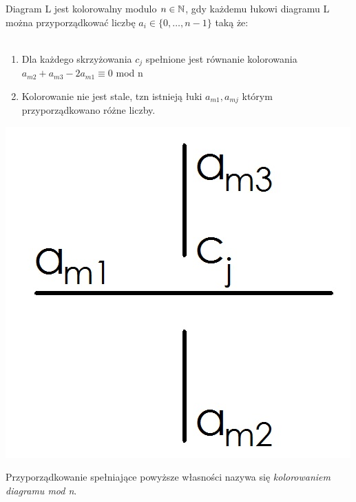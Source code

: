 \begin{definicja}
Diagram L jest kolorowalny modulo $n \in \mathbb N$, gdy każdemu łukowi diagramu L można przyporządkować liczbę $a_{i} \in \lbrace 0, \ldots, n-1 \rbrace$ taką że: \\ \\
	\begin{minipage}{0.7\textwidth}
	
	\begin{enumerate}
		\item Dla każdego skrzyżowania $c_{j}$ spełnione jest równanie kolorowania \\ $a_{m2}+a_{m3}-2a_{m1} \equiv 0$ mod n
		\item Kolorowanie nie jest stale, tzn istnieją łuki $a_{m1}, a_{mj}$ którym 			przyporządkowano różne liczby.
		 
	\end{enumerate}
	\end{minipage}
	\begin{minipage}{0.3\textwidth}
	\begin{center}

	\includegraphics[scale=0.2]{2/Obrazy/Crossing1}
	\end{center}
	\end{minipage}
\end{definicja}
Przyporządkowanie spełniające powyższe własności nazywa się \emph{kolorowaniem diagramu mod n}.




